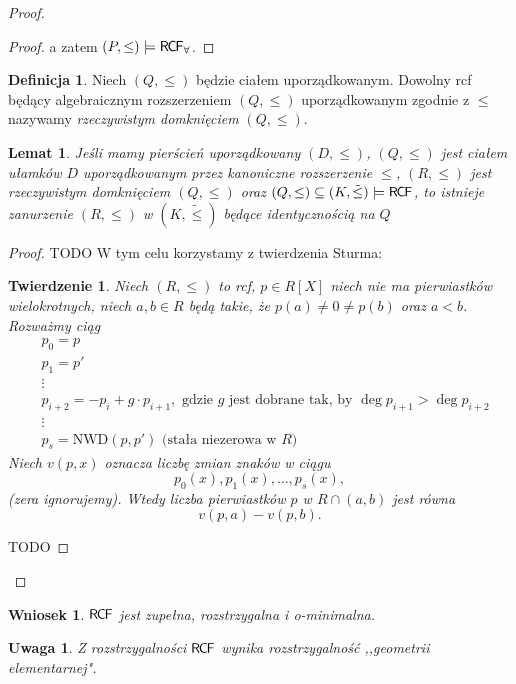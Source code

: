 \documentclass{article}
\theoremstyle{plain}
\newtheorem{tw}[thm]{Twierdzenie}
\newtheorem{wn}[thm]{Wniosek}
\newtheorem{lem}[thm]{Lemat}
\newtheorem{uw}[thm]{Uwaga}
\theoremstyle{definition}
\newtheorem{df}[thm]{Definicja}
\theoremstyle{remark}
\newcommand{\RCF}{\mathsf{R \mkern-1.7mu C \mkern-1.4mu F}}
\begin{document}
\begin{proof}
\begin{proof}
		 a zatem $(P, \leq) \models \RCF_{\forall}$.
	\end{proof}
	\begin{df}
		 Niech $(Q, \leq)$ będzie ciałem uporządkowanym.
		 Dowolny rcf będący algebraicznym rozszerzeniem $(Q, \leq)$ uporządkowanym zgodnie z $ \leq$ nazywamy
		 \textit{rzeczywistym domknięciem} $ (Q, \leq)$.
	\end{df}
	\begin{lem}
		 Jeśli mamy pierścień uporządkowany $ (D, \leq)$,
		 $(Q, \leq)$ jest ciałem ułamków $D$ uporządkowanym przez kanoniczne rozszerzenie $\leq$,
		 $ (R, \leq)$ jest rzeczywistym domknięciem $ (Q, \leq)$
		 oraz $ (Q, \leq) \subseteq (K, \tilde{\leq}) \models \RCF$,
		 to istnieje zanurzenie $ (R, \leq)$ w $ (K, \tilde{\leq})$ będące identycznością na $ Q$
	\end{lem}
	\begin{proof}
		 TODO
		W tym celu korzystamy z twierdzenia Sturma:
		\begin{tw} \label{tw:sturma}
			Niech $(R, \leq)$ to rcf, $p \in R[X]$ niech nie ma
			pierwiastków wielokrotnych, niech $a, b \in R$ będą
			takie, że $p(a) \neq 0 \neq p(b)$ oraz $a < b$.
			Rozważmy ciąg
			\begin{align*}
				&p_0 = p \\
				&p_1 = p' \\
				&\vdots \\
				&p_{i+2} = -p_i + g \cdot p_{i + 1},
				\text{ gdzie } g \text{ jest dobrane tak, by }
				\deg p_{i+1} > \deg  p_{i+2} \\
				&\vdots \\
				&p_s = \text{NWD}(p, p')
				\text{ (stała niezerowa w } R\text{)}
			\end{align*}
			Niech $v(p, x)$ oznacza liczbę zmian znaków w ciągu
			$$p_0(x), p_1(x), \ldots, p_s(x),$$
			(zera ignorujemy). Wtedy liczba pierwiastków $p$
			w $R \cap (a, b)$ jest równa $$v(p, a) - v(p, b).$$
		\end{tw}
		 TODO
	\end{proof}




\end{proof}

\begin{wn}
	$ \RCF$ jest zupełna, rozstrzygalna i \textit{o}-minimalna.
\end{wn}

\begin{uw}
	 Z rozstrzygalności $ \RCF$ wynika rozstrzygalność ,,geometrii elementarnej".
\end{uw}
\end{document}
